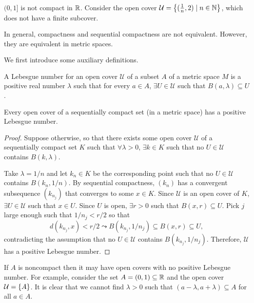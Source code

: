 \begin{ex}
    $(0, 1]$ is not compact in ${\mathbb R}$. Consider the open cover $\mathcal U = {\left\{{(\frac1n, 2) \mid n\in {\mathbb N}}\right\}}$, which does not have a finite subcover.
\end{ex}

In general, compactness and sequential compactness are not equivalent. However, they are equivalent in metric spaces.

We first introduce some auxiliary definitions.

\begin{df}
    A Lebesgue number for an open cover $\mathcal U$ of a subset $A$ of a metric space $M$ is a positive real number $\lambda$ such that for every $a\in A$, $\exists U \in \mathcal U$ such that $B(a, \lambda) \subseteq U$.
\end{df}

\begin{lm}
    Every open cover of a sequentially compact set (in a metric space) has a positive Lebesgue number.
    \begin{proof}
        Suppose otherwise, so that there exists some open cover $\mathcal U$ of a sequentially compact set $K$ such that $\forall \lambda > 0$, $\exists k \in K$ such that no $U\in \mathcal U$ contains $B(k, \lambda)$. 

        Take $\lambda = 1/n$ and let $k_n \in K$ be the corresponding point such that no $U\in \mathcal U$ contains $B(k_n, 1/n)$. By sequential compactness, $(k_n)$ has a convergent subsequence $(k_{n_j})$ that converges to some $x\in K$. Since $\mathcal U$ is an open cover of $K$, $\exists U \in \mathcal U$ such that $x\in U$. Since $U$ is open, $\exists r > 0$ such that $B(x, r) \subseteq U$. Pick $j$ large enough such that $1/n_j < r/2$ so that
        \[
        d(k_{n_j}, x) < r/2 \leadsto B(k_{n_j}, 1/n_j) \subseteq B(x, r) \subseteq U,
        \]
        contradicting the assumption that no $U\in \mathcal U$ contains $B(k_{n_j}, 1/n_j)$. Therefore, $\mathcal U$ has a positive Lebesgue number.
    \end{proof}
\end{lm}

If $A$ is noncompact then it may have open covers with no positive Lebesgue number. For example, consider the set $A = (0, 1) \subseteq {\mathbb R}$ and the open cover $\mathcal U = {\left\{{A}\right\}}$. It is clear that we cannot find $\lambda > 0$ such that $(a-\lambda, a+\lambda) \subseteq A$ for all $a\in A$.

